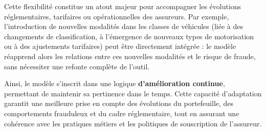 Cette flexibilité constitue un atout majeur pour accompagner les évolutions réglementaires, tarifaires ou opérationnelles des assureurs. Par exemple, l'introduction de nouvelles modalités dans les classes de véhicules (liée à des changements de classification, à l'émergence de nouveaux types de motorisation ou à des ajustements tarifaires) peut être directement intégrée : le modèle réapprend alors les relations entre ces nouvelles modalités et le risque de fraude, sans nécessiter une refonte complète de l'outil.

Ainsi, le modèle s'inscrit dans une logique \textbf{d'amélioration continue}, permettant de maintenir sa pertinence dans le temps. Cette capacité d'adaptation garantit une meilleure prise en compte des évolutions du portefeuille, des comportements frauduleux et du cadre réglementaire, tout en assurant une cohérence avec les pratiques métiers et les politiques de souscription de l'assureur.